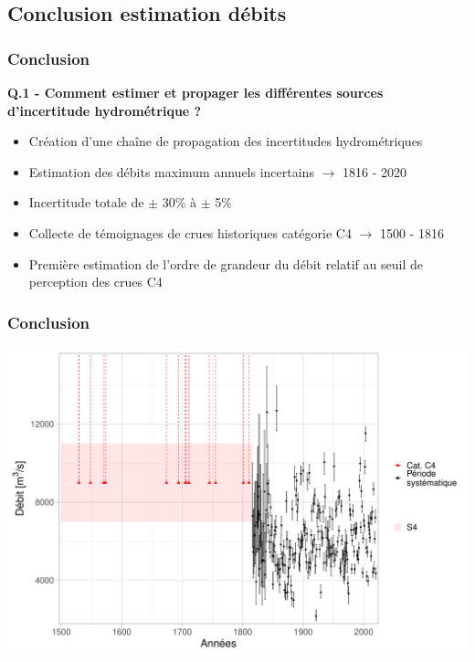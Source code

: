 \documentclass[compress,9pt]{beamer}
\begin{document}
	\subsection{Conclusion estimation débits}
	\begin{frame}[t]
		\frametitle{Conclusion}
		\vfill
		\centering
		\large{\textbf{Q.1 - Comment estimer et propager les différentes sources d'incertitude
hydrométrique ?}}
		\vfill
		\normalsize
		\begin{itemize}
			\item<1->[$\vartriangleright$] Création d'une chaîne de propagation des incertitudes hydrométriques
			\vspace{10pt}
			\item<2->[$\vartriangleright$] Estimation des débits maximum annuels incertains $\rightarrow$ 1816 - 2020
			\vspace{10pt}
			\item<3->[$\vartriangleright$] Incertitude totale de $\pm$ 30\% à $\pm$ 5\% 
			\vspace{10pt}
			\item<4->[$\vartriangleright$] Collecte de témoignages de crues historiques catégorie C4 $\rightarrow$ 1500 - 1816
			\vspace{10pt}
			\item<5->[$\vartriangleright$] Première estimation de l'ordre de grandeur du débit relatif au seuil de perception des crues C4
		\end{itemize}
	\end{frame}
	
	\begin{frame}
		\frametitle{Conclusion}
		\vfill
		\centering
		\includegraphics[width = .9\textwidth]{./Figures/EchMixteC4Bcr.pdf} 
	\end{frame}
\end{document}
